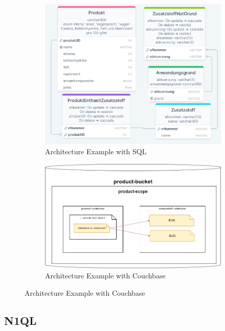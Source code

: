 \begin{figure}[H]
    \centering
    \caption{Architecture Examples}
    \begin{subfigure}{0.48\textwidth}
        \centering
        \caption{Architecture Example with \ac{SQL}}
        \includegraphics[width=1\textwidth]{images/Architecture_Example_SQL.png} %
    \end{subfigure}\hfill
    \begin{subfigure}{0.48\textwidth}
        \centering
        \caption{Architecture Example with Couchbase}
        \includegraphics[width=1\textwidth]{images/Architecture_Example_Couchbase.png} %
    \end{subfigure}
\end{figure}

\subsection{N1QL}

